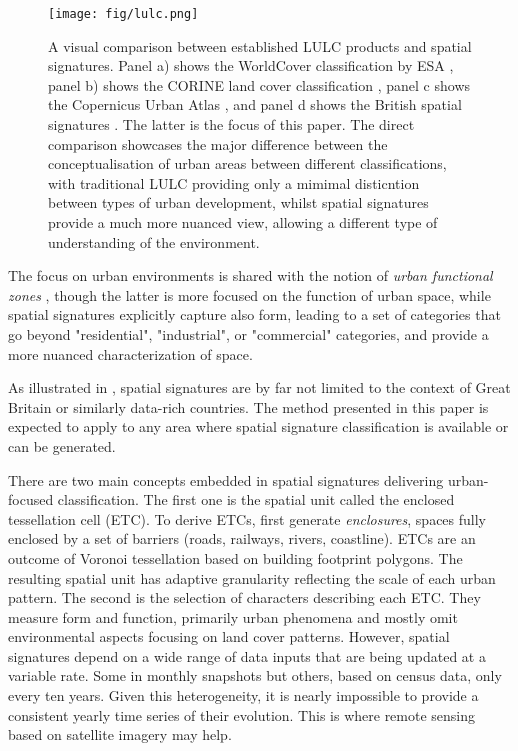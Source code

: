 \begin{figure}
    \centering
    \texttt{[image: fig/lulc.png]}
    \caption{\footnotesize A visual comparison between established LULC products and
    spatial signatures. Panel a) shows the WorldCover classification by ESA
    \citep{zanaga_daniele_2021_5571936}, panel b) shows the  CORINE land cover
    classification \citep{europeanenvironmentagency1990}, panel c shows the  Copernicus
    Urban Atlas \citep{urban_atlas}, and panel d shows the British spatial signatures
    \citep{fleischmann2022geographical}. The latter is the focus of this paper. The
    direct comparison showcases the major difference between the conceptualisation of
    urban areas between different classifications, with traditional LULC providing only
    a mimimal disticntion between types of urban development, whilst spatial signatures
    provide a much more nuanced view, allowing a different type of understanding of the
    environment.}
    \label{fig:lulc}
\end{figure}

The focus on urban environments is shared with the notion of \textit{urban functional zones}
\citep{lu2022urban, izzo2022classification, jing2022method},
though the latter is more focused on the function of urban space, while spatial signatures
explicitly capture also form, leading to a set of categories that go beyond "residential",
"industrial", or "commercial" categories, and provide a more nuanced characterization of space.

As illustrated in \cite{dab_mf_2021a}, spatial signatures are by far not limited to the context of
Great Britain or similarly data-rich countries. The method presented in this paper is expected
to apply to any area where spatial signature classification is available or can be generated.

There are two main concepts embedded in spatial signatures delivering urban-focused
classification. The first one is the spatial unit called the enclosed tessellation cell
(ETC). To derive ETCs, \cite{dab_mf_2021a} first generate \textit{enclosures}, spaces fully enclosed by
a set of barriers (roads, railways, rivers, coastline). ETCs are an outcome of
Voronoi tessellation based on building footprint polygons. The resulting spatial unit
has adaptive granularity reflecting the scale of each urban pattern. The
second is the selection of characters describing each ETC. They measure form and function,
primarily urban phenomena and mostly omit environmental aspects focusing on land
cover patterns. However, spatial signatures depend on a wide range of data inputs that
are being updated at a variable rate. Some in monthly snapshots but others,
based on census data, only every ten years. Given this heterogeneity,
it is nearly impossible to provide a consistent yearly time series of their evolution.
This is where remote sensing based on satellite imagery may help.

